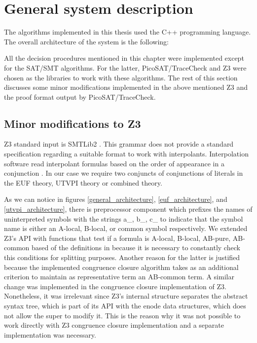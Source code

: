 \section{General system description}

The algorithms implemented in this thesis used the C++ programming
language. The overall architecture of the system is the following:





All the decision procedures mentioned in this chapter
were implemented except for the SAT/SMT algorithms.
For the latter, PicoSAT/TraceCheck\cite{picosat08} and Z3 
\cite{10.1007/978-3-540-78800-3_24} were chosen as the 
libraries to work with these algorithms. 
The rest of this section discusses some minor modifications 
implemented in the above mentioned Z3 and the proof format 
output by PicoSAT/TraceCheck.

\subsection{Minor modifications to Z3}

Z3 standard input is SMTLib2 \cite{BarFT-SMTLIB}. This grammar
does not provide a standard specification regarding a suitable
format to work with interpolants. Interpolation software
read interpolant formulas based on the order of appearance
in a conjunction \cite{mcmillan2011interpolants}. In our case
we require two conjuncts of conjunctions of literals in the
EUF theory, UTVPI theory or combined theory. 

As we can notice in figures \ref{general_architecture}, \ref{euf_architecture},
and \ref{utvpi_architecture}, there is preprocessor component which prefixes
the names of uninterpreted symbols with the strings a\_, b\_, c\_
to indicate that the symbol name is either an A-local, B-local, or
common symbol respectively. We extended Z3's API with functions
that test if a formula is A-local, B-local, AB-pure, AB-common
based of the definitions in \cite{10.1007/11532231_26} because 
it is necessary to constantly check this conditions for splitting
purposes. Another reason for the latter is justified because the 
implemented congruence closure algorithm takes as an additional
criterion to maintain as representative term an AB-common term.
A similar change was implemented in the congruence closure implementation
of Z3. Nonetheless, it was irrelevant since Z3's internal structure
separates the abstract syntax tree, which is part of its API
with the enode data structures, which does not allow the super
to modify it. This is the reason why it was not
possible to work directly with Z3 congruence closure implementation
and a separate implementation was necessary.

